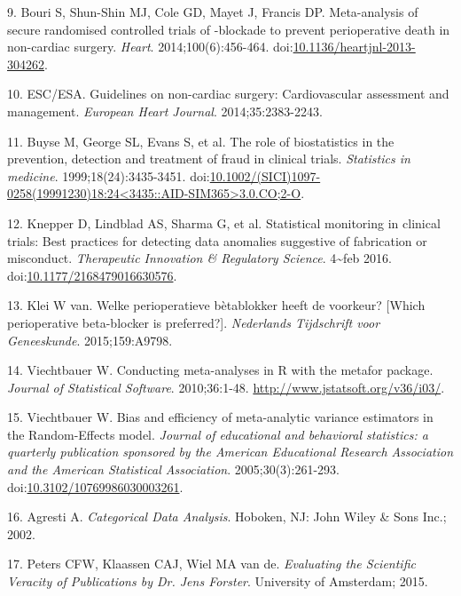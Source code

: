 \documentclass[]{article}
\begin{document}
\hypertarget{ref-bouri2014}{}
9. Bouri S, Shun-Shin MJ, Cole GD, Mayet J, Francis DP. Meta-analysis of
secure randomised controlled trials of -blockade to prevent
perioperative death in non-cardiac surgery. \emph{Heart}.
2014;100(6):456-464.
doi:\href{https://doi.org/10.1136/heartjnl-2013-304262}{10.1136/heartjnl-2013-304262}.

\hypertarget{ref-esc2014}{}
10. ESC/ESA. Guidelines on non-cardiac surgery: Cardiovascular
assessment and management. \emph{European Heart Journal}.
2014;35:2383-2243.

\hypertarget{ref-Buyse1999-jq}{}
11. Buyse M, George SL, Evans S, et al. The role of biostatistics in the
prevention, detection and treatment of fraud in clinical trials.
\emph{Statistics in medicine}. 1999;18(24):3435-3451.
doi:\href{https://doi.org/10.1002/(SICI)1097-0258(19991230)18:24\%3C3435::AID-SIM365\%3E3.0.CO;2-O}{10.1002/(SICI)1097-0258(19991230)18:24\textless{}3435::AID-SIM365\textgreater{}3.0.CO;2-O}.

\hypertarget{ref-Knepper2016-la}{}
12. Knepper D, Lindblad AS, Sharma G, et al. Statistical monitoring in
clinical trials: Best practices for detecting data anomalies suggestive
of fabrication or misconduct. \emph{Therapeutic Innovation \& Regulatory
Science}. 4\textasciitilde{}feb 2016.
doi:\href{https://doi.org/10.1177/2168479016630576}{10.1177/2168479016630576}.

\hypertarget{ref-klei2015}{}
13. Klei W van. Welke perioperatieve bètablokker heeft de voorkeur?
{[}Which perioperative beta-blocker is preferred?{]}. \emph{Nederlands
Tijdschrift voor Geneeskunde}. 2015;159:A9798.

\hypertarget{ref-viechtbauer2010}{}
14. Viechtbauer W. Conducting meta-analyses in R with the metafor
package. \emph{Journal of Statistical Software}. 2010;36:1-48.
\url{http://www.jstatsoft.org/v36/i03/}.

\hypertarget{ref-viechtbauer2005}{}
15. Viechtbauer W. Bias and efficiency of meta-analytic variance
estimators in the Random-Effects model. \emph{Journal of educational and
behavioral statistics: a quarterly publication sponsored by the American
Educational Research Association and the American Statistical
Association}. 2005;30(3):261-293.
doi:\href{https://doi.org/10.3102/10769986030003261}{10.3102/10769986030003261}.

\hypertarget{ref-agresti2002}{}
16. Agresti A. \emph{Categorical Data Analysis}. Hoboken, NJ: John Wiley
\& Sons Inc.; 2002.

\hypertarget{ref-peters2015}{}
17. Peters CFW, Klaassen CAJ, Wiel MA van de. \emph{Evaluating the
Scientific Veracity of Publications by Dr. Jens Forster}. University of
Amsterdam; 2015.
\end{document}
